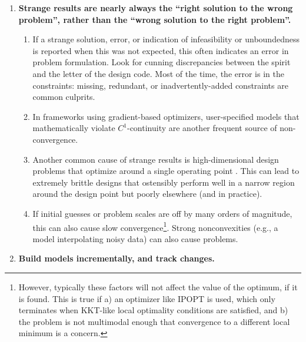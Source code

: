 \begin{enumerate}
\begin{enumerate}
        \item When one is developing models, one's relationship with the optimizer is adversarial. Models should extrapolate sensibly and generally be parsimonious—errors will be \emph{actively} exploited. Because of this, it takes much more finesse to write an analysis tool that is amenable to optimization than one that merely solves the analysis problem.
        \item Consider robustness early. In nature\footnote{Mother Nature being arguably history's most successful optimizer}, optima are usually not near extremes.
    \end{enumerate}
    \item \textbf{Strange results are nearly always the ``right solution to the wrong problem'', rather than the ``wrong solution to the right problem''.}
    \begin{enumerate}
        \item If a strange solution, error, or indication of infeasibility or unboundedness is reported when this was not expected, this often indicates an error in problem formulation. Look for cunning discrepancies between the spirit and the letter of the design code. Most of the time, the error is in the constraints: missing, redundant, or inadvertently-added constraints are common culprits.
        \item In frameworks using gradient-based optimizers, user-specified models that mathematically violate $C^1$-continuity are another frequent source of non-convergence.
        \item Another common cause of strange results is high-dimensional design problems that optimize around a single operating point \cite{drela_pros_1998}. This can lead to extremely brittle designs that ostensibly perform well in a narrow region around the design point but poorly elsewhere (and in practice).
        \item If initial guesses or problem scales are off by many orders of magnitude, this can also cause slow convergence\footnote{However, typically these factors will not affect the value of the optimum, if it is found. This is true if a) an optimizer like IPOPT is used, which only terminates when KKT-like local optimality conditions are satisfied, and b) the problem is not multimodal enough that convergence to a different local minimum is a concern.}. Strong nonconvexities (e.g., a model interpolating noisy data) can also cause problems.
    \end{enumerate}
    \item \textbf{Build models incrementally, and track changes.}

\end{enumerate}

